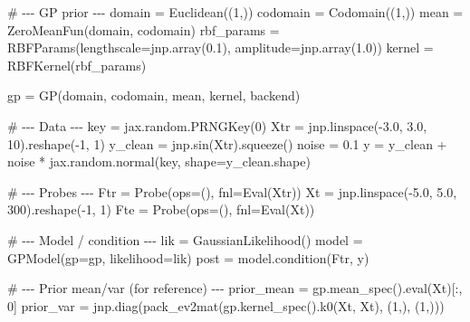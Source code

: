 \documentclass[
  letterpaper,
  DIV=11,
  numbers=noendperiod]{scrartcl}
\newenvironment{Shaded}{\begin{snugshade}}{\end{snugshade}}
\newcommand{\BuiltInTok}[1]{\textcolor[rgb]{0.00,0.23,0.31}{#1}}
\newcommand{\CommentTok}[1]{\textcolor[rgb]{0.37,0.37,0.37}{#1}}
\newcommand{\DecValTok}[1]{\textcolor[rgb]{0.68,0.00,0.00}{#1}}
\newcommand{\FloatTok}[1]{\textcolor[rgb]{0.68,0.00,0.00}{#1}}
\newcommand{\NormalTok}[1]{\textcolor[rgb]{0.00,0.23,0.31}{#1}}
\newcommand{\OperatorTok}[1]{\textcolor[rgb]{0.37,0.37,0.37}{#1}}
\begin{document}
\begin{Shaded}
\begin{Highlighting}[]
\CommentTok{\# {-}{-}{-} GP prior {-}{-}{-}}
\NormalTok{domain   }\OperatorTok{=}\NormalTok{ Euclidean((}\DecValTok{1}\NormalTok{,))}
\NormalTok{codomain }\OperatorTok{=}\NormalTok{ Codomain((}\DecValTok{1}\NormalTok{,))}
\NormalTok{mean     }\OperatorTok{=}\NormalTok{ ZeroMeanFun(domain, codomain)}
\NormalTok{rbf\_params }\OperatorTok{=}\NormalTok{ RBFParams(lengthscale}\OperatorTok{=}\NormalTok{jnp.array(}\FloatTok{0.1}\NormalTok{), amplitude}\OperatorTok{=}\NormalTok{jnp.array(}\FloatTok{1.0}\NormalTok{))}
\NormalTok{kernel   }\OperatorTok{=}\NormalTok{ RBFKernel(rbf\_params)}

\NormalTok{gp }\OperatorTok{=}\NormalTok{ GP(domain, codomain, mean, kernel, backend)}

\CommentTok{\# {-}{-}{-} Data {-}{-}{-}}
\NormalTok{key }\OperatorTok{=}\NormalTok{ jax.random.PRNGKey(}\DecValTok{0}\NormalTok{)}
\NormalTok{Xtr }\OperatorTok{=}\NormalTok{ jnp.linspace(}\OperatorTok{{-}}\FloatTok{3.0}\NormalTok{, }\FloatTok{3.0}\NormalTok{, }\DecValTok{10}\NormalTok{).reshape(}\OperatorTok{{-}}\DecValTok{1}\NormalTok{, }\DecValTok{1}\NormalTok{)}
\NormalTok{y\_clean }\OperatorTok{=}\NormalTok{ jnp.sin(Xtr).squeeze()}
\NormalTok{noise }\OperatorTok{=} \FloatTok{0.1}
\NormalTok{y }\OperatorTok{=}\NormalTok{ y\_clean }\OperatorTok{+}\NormalTok{ noise }\OperatorTok{*}\NormalTok{ jax.random.normal(key, shape}\OperatorTok{=}\NormalTok{y\_clean.shape)}

\CommentTok{\# {-}{-}{-} Probes {-}{-}{-}}
\NormalTok{Ftr }\OperatorTok{=}\NormalTok{ Probe(ops}\OperatorTok{=}\NormalTok{(), fnl}\OperatorTok{=}\NormalTok{Eval(Xtr))}
\NormalTok{Xt  }\OperatorTok{=}\NormalTok{ jnp.linspace(}\OperatorTok{{-}}\FloatTok{5.0}\NormalTok{, }\FloatTok{5.0}\NormalTok{, }\DecValTok{300}\NormalTok{).reshape(}\OperatorTok{{-}}\DecValTok{1}\NormalTok{, }\DecValTok{1}\NormalTok{)}
\NormalTok{Fte }\OperatorTok{=}\NormalTok{ Probe(ops}\OperatorTok{=}\NormalTok{(), fnl}\OperatorTok{=}\NormalTok{Eval(Xt))}

\CommentTok{\# {-}{-}{-} Model / condition {-}{-}{-}}
\NormalTok{lik   }\OperatorTok{=}\NormalTok{ GaussianLikelihood()}
\NormalTok{model }\OperatorTok{=}\NormalTok{ GPModel(gp}\OperatorTok{=}\NormalTok{gp, likelihood}\OperatorTok{=}\NormalTok{lik)}
\NormalTok{post  }\OperatorTok{=}\NormalTok{ model.condition(Ftr, y)}

\CommentTok{\# {-}{-}{-} Prior mean/var (for reference) {-}{-}{-}}
\NormalTok{prior\_mean }\OperatorTok{=}\NormalTok{ gp.mean\_spec().}\BuiltInTok{eval}\NormalTok{(Xt)[:, }\DecValTok{0}\NormalTok{]}
\NormalTok{prior\_var  }\OperatorTok{=}\NormalTok{ jnp.diag(pack\_ev2mat(gp.kernel\_spec().k0(Xt, Xt), (}\DecValTok{1}\NormalTok{,), (}\DecValTok{1}\NormalTok{,)))}


\end{Highlighting}
\end{Shaded}
\end{document}
